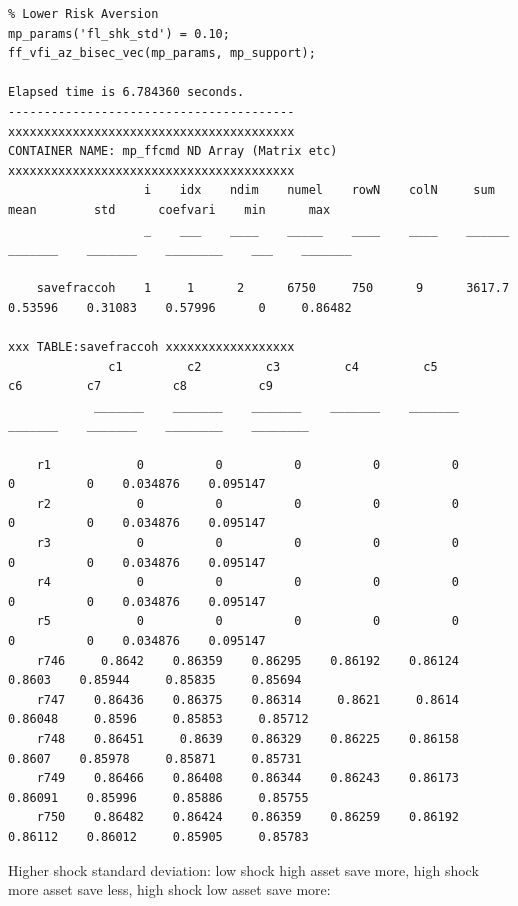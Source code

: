 \documentclass[
]{book}
\begin{document}
\begin{verbatim}
% Lower Risk Aversion
mp_params('fl_shk_std') = 0.10;
ff_vfi_az_bisec_vec(mp_params, mp_support);

Elapsed time is 6.784360 seconds.
----------------------------------------
xxxxxxxxxxxxxxxxxxxxxxxxxxxxxxxxxxxxxxxx
CONTAINER NAME: mp_ffcmd ND Array (Matrix etc)
xxxxxxxxxxxxxxxxxxxxxxxxxxxxxxxxxxxxxxxx
                   i    idx    ndim    numel    rowN    colN     sum       mean        std      coefvari    min      max  
                   _    ___    ____    _____    ____    ____    ______    _______    _______    ________    ___    _______

    savefraccoh    1     1      2      6750     750      9      3617.7    0.53596    0.31083    0.57996      0     0.86482

xxx TABLE:savefraccoh xxxxxxxxxxxxxxxxxx
              c1         c2         c3         c4         c5         c6         c7          c8          c9   
            _______    _______    _______    _______    _______    _______    _______    ________    ________

    r1            0          0          0          0          0          0          0    0.034876    0.095147
    r2            0          0          0          0          0          0          0    0.034876    0.095147
    r3            0          0          0          0          0          0          0    0.034876    0.095147
    r4            0          0          0          0          0          0          0    0.034876    0.095147
    r5            0          0          0          0          0          0          0    0.034876    0.095147
    r746     0.8642    0.86359    0.86295    0.86192    0.86124     0.8603    0.85944     0.85835     0.85694
    r747    0.86436    0.86375    0.86314     0.8621     0.8614    0.86048     0.8596     0.85853     0.85712
    r748    0.86451     0.8639    0.86329    0.86225    0.86158     0.8607    0.85978     0.85871     0.85731
    r749    0.86466    0.86408    0.86344    0.86243    0.86173    0.86091    0.85996     0.85886     0.85755
    r750    0.86482    0.86424    0.86359    0.86259    0.86192    0.86112    0.86012     0.85905     0.85783
\end{verbatim}

Higher shock standard deviation: low shock high asset save more, high
shock more asset save less, high shock low asset save more:
\end{document}
